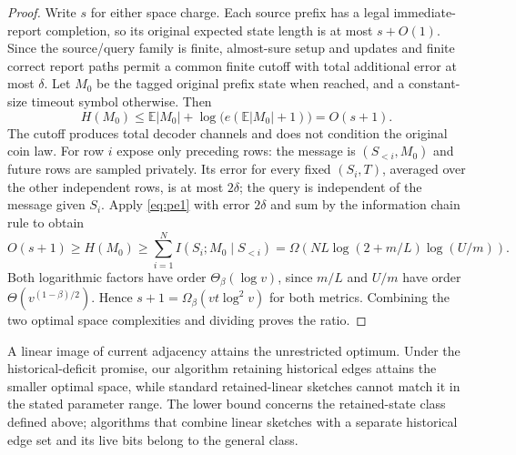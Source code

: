 \documentclass[11pt,letterpaper]{article}
\numberwithin{equation}{section}
\newcommand{\E}{\mathbb E}
\begin{document}
\begin{proof}
Write $s$ for either space charge.
Each source prefix has a legal immediate-report completion, so its original expected state length is at most $s+O(1)$.
Since the source/query family is finite, almost-sure setup and updates and finite correct report paths permit a common finite cutoff with total additional error at most $\delta$.
Let $M_0$ be the tagged original prefix state when reached, and a constant-size timeout symbol otherwise.
Then
\[
 H(M_0)\le\E|M_0|+
 \log\bigl(e(\E|M_0|+1)\bigr)=O(s+1).
\]
The cutoff produces total decoder channels and does not condition the original coin law.
For row $i$ expose only preceding rows: the message is $(S_{<i},M_0)$ and future rows are sampled privately.
Its error for every fixed $(S_i,T)$, averaged over the other independent rows, is at most $2\delta$; the query is independent of the message given $S_i$.
Apply \eqref{eq:pe1} with error $2\delta$ and sum by the information chain rule to obtain
\[
 O(s+1)\ge H(M_0)\ge
 \sum_{i=1}^N I(S_i;M_0\mid S_{<i})
 =\Omega\!\left(NL\log(2+m/L)\log(U/m)\right).
\]
Both logarithmic factors have order $\Theta_\beta(\log v)$, since $m/L$ and $U/m$ have order $\Theta(v^{(1-\beta)/2})$.
Hence $s+1=\Omega_\beta(vt\log^2v)$ for both metrics.
Combining the two optimal space complexities and dividing proves the ratio.
\end{proof}




A linear image of current adjacency attains the unrestricted optimum.
Under the historical-deficit promise, our algorithm retaining historical edges attains the smaller optimal space, while standard retained-linear sketches cannot match it in the stated parameter range.
The lower bound concerns the retained-state class defined above; algorithms that combine linear sketches with a separate historical edge set and its live bits belong to the general class.


\clearpage
\appendix
\end{document}
